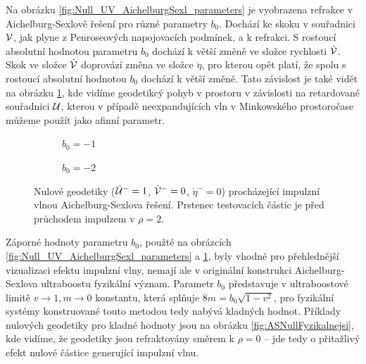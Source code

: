 Na obrázku \ref{fig:Null_UV_AichelburgSexl_parameters} je vyobrazena refrakce v Aichelburg-Sexlově řešení pro různé
parametry $b_0$. Dochází ke skoku v souřadnici $\mathcal{V}$, jak plyne z Penroseových napojovacích podmínek, a k refrakci.
S rostoucí absolutní hodnotou parametru $b_0$ dochází k větší změně ve složce rychlosti $\dot {\mathcal{V}}$.
Skok ve složce $\dot {\mathcal{V}}$ doprovází změna ve složce $\dot \eta$, pro kterou opět platí, že spolu s
rostoucí absolutní hodnotou $b_0$ dochází k větší změně. Tato závislost je také vidět na obrázku \ref{fig:NullASRing01},
kde vidíme geodetikcý pohyb v prostoru v závislosti na retardované souřadnici $\mathcal{U}$, kterou v případě neexpandujících vln
v Minkowského prostoročase můžeme použít jako afinní parametr.

\begin{figure}[h]
    \centering
    \begin{subfigure}[b]{0.45\textwidth}
        \caption{$b_0 = -1$}
    \end{subfigure}
    \hfill
    \begin{subfigure}[b]{0.45\textwidth}
        \caption{$b_0 = -2$}
    \end{subfigure}
    \caption{Nulové geodetiky ($\dot {\mathcal{U}}^-=1$, $\dot {\mathcal{V}}^-=0$, $\dot \eta^-=0$) procházející impulzní vlnou Aichelburg-Sexlova řešení. Prstenec testovacích částic je před průchodem impulzem v $\rho=2$.}
    \label{fig:NullASRing01}
\end{figure}

Záporné hodnoty parametru $b_0$, použté na obrázcích \ref{fig:Null_UV_AichelburgSexl_parameters} a \ref{fig:NullASRing01}, byly vhodné pro přehlednější vizualizaci
efektu impulzní vlny, nemají ale v originální konstrukci Aichelburg-Sexlova ultraboostu fyzikální význam. Parametr $b_0$
představuje v ultraboostové limitě $v \to 1, m \to 0$ konstantu, která splňuje $8m = b_0\sqrt{1-v^2}$, pro fyzikální systémy konstruované touto metodou
tedy nabývá kladných hodnot. Příklady nulových geodetiky pro kladné hodnoty jsou na obrázku \ref{fig:ASNullFyzikalnejsi}, kde vidíme,
že geodetiky jsou refraktovány směrem k $\rho=0$ -- jde tedy o přitažlivý efekt nulové částice generující impulzní vlnu.

